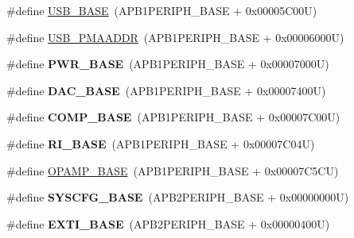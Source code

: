 \begin{DoxyCompactItemize}
\item 
\#define \hyperlink{group___peripheral__memory__map_gaa6c4cbed4ddbb3ecd77de93fab2a2e04}{U\-S\-B\-\_\-\-B\-A\-S\-E}~(A\-P\-B1\-P\-E\-R\-I\-P\-H\-\_\-\-B\-A\-S\-E + 0x00005\-C00\-U)
\item 
\#define \hyperlink{group___peripheral__memory__map_gaf992dfdd5707568c5cb5506e2347e808}{U\-S\-B\-\_\-\-P\-M\-A\-A\-D\-D\-R}~(A\-P\-B1\-P\-E\-R\-I\-P\-H\-\_\-\-B\-A\-S\-E + 0x00006000\-U)
\item 
\hypertarget{group___peripheral__memory__map_gac691ec23dace8b7a649a25acb110217a}{\#define {\bfseries P\-W\-R\-\_\-\-B\-A\-S\-E}~(A\-P\-B1\-P\-E\-R\-I\-P\-H\-\_\-\-B\-A\-S\-E + 0x00007000\-U)}\label{group___peripheral__memory__map_gac691ec23dace8b7a649a25acb110217a}

\item 
\hypertarget{group___peripheral__memory__map_gad18d0b914c7f68cecbee1a2d23a67d38}{\#define {\bfseries D\-A\-C\-\_\-\-B\-A\-S\-E}~(A\-P\-B1\-P\-E\-R\-I\-P\-H\-\_\-\-B\-A\-S\-E + 0x00007400\-U)}\label{group___peripheral__memory__map_gad18d0b914c7f68cecbee1a2d23a67d38}

\item 
\hypertarget{group___peripheral__memory__map_gaa9f5d2999c6918e385d7a526c4f6b1d3}{\#define {\bfseries C\-O\-M\-P\-\_\-\-B\-A\-S\-E}~(A\-P\-B1\-P\-E\-R\-I\-P\-H\-\_\-\-B\-A\-S\-E + 0x00007\-C00\-U)}\label{group___peripheral__memory__map_gaa9f5d2999c6918e385d7a526c4f6b1d3}

\item 
\hypertarget{group___peripheral__memory__map_ga8fdc749e6f184b3cd9b01f179af62e4c}{\#define {\bfseries R\-I\-\_\-\-B\-A\-S\-E}~(A\-P\-B1\-P\-E\-R\-I\-P\-H\-\_\-\-B\-A\-S\-E + 0x00007\-C04\-U)}\label{group___peripheral__memory__map_ga8fdc749e6f184b3cd9b01f179af62e4c}

\item 
\#define \hyperlink{group___peripheral__memory__map_ga6e9722d15c7ed794f0eca9682f64c03c}{O\-P\-A\-M\-P\-\_\-\-B\-A\-S\-E}~(A\-P\-B1\-P\-E\-R\-I\-P\-H\-\_\-\-B\-A\-S\-E + 0x00007\-C5\-C\-U)
\item 
\hypertarget{group___peripheral__memory__map_ga62246020bf3b34b6a4d8d0e84ec79d3d}{\#define {\bfseries S\-Y\-S\-C\-F\-G\-\_\-\-B\-A\-S\-E}~(A\-P\-B2\-P\-E\-R\-I\-P\-H\-\_\-\-B\-A\-S\-E + 0x00000000\-U)}\label{group___peripheral__memory__map_ga62246020bf3b34b6a4d8d0e84ec79d3d}

\item 
\hypertarget{group___peripheral__memory__map_ga87371508b3bcdcd98cd1ec629be29061}{\#define {\bfseries E\-X\-T\-I\-\_\-\-B\-A\-S\-E}~(A\-P\-B2\-P\-E\-R\-I\-P\-H\-\_\-\-B\-A\-S\-E + 0x00000400\-U)}\label{group___peripheral__memory__map_ga87371508b3bcdcd98cd1ec629be29061}


\end{DoxyCompactItemize}
